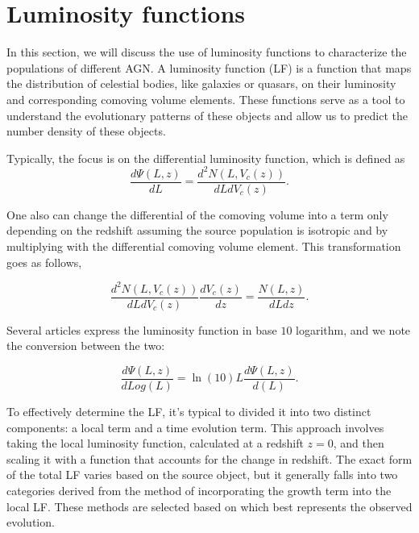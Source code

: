 \section{ Luminosity functions}
In this section, we will discuss the use of luminosity functions to characterize the populations of different AGN. 
A luminosity function (LF) is a function that maps the distribution of celestial bodies, like galaxies or quasars,
on their luminosity and corresponding comoving volume elements. These functions serve as a tool to understand the evolutionary patterns of these objects and allow us 
to predict the number density of these objects. 

Typically, the focus is on the differential luminosity function, which is defined as
\begin{equation}
    \frac{d\Psi(L,z)}{dL} = \frac{d^2N(L,V_c(z))}{dLdV_c(z)}.
\end{equation}

One also can change the differential of the comoving volume into a term only depending on the redshift assuming the source population is isotropic and by multiplying with the differential comoving volume element. This 
transformation goes as follows, 

\begin{equation}
    \frac{d^2N(L,V_c(z))}{dLdV_c(z)}\frac{dV_c(z)}{dz} = \frac{N(L,z)}{dLdz}.
\end{equation}


Several articles express the luminosity function in base $10$ logarithm, and we note the conversion between the two:


\begin{equation}
    \frac{d\Psi(L,z)}{dLog(L)} =  \ln (10)  L \frac{d\Psi(L,z)}{d(L)}.
\end{equation}


To effectively determine the LF, it's typical to divided it into two distinct components: a local term and a time evolution term.
 This approach involves taking the local luminosity function, calculated at a redshift 
$z=0$, and then scaling it with a function that accounts for the change in redshift. 
The exact form of the total LF varies based on the source object, but it generally falls into two categories derived from the method of incorporating the growth term into the local LF.
 These methods are selected based on which best represents the observed evolution.

